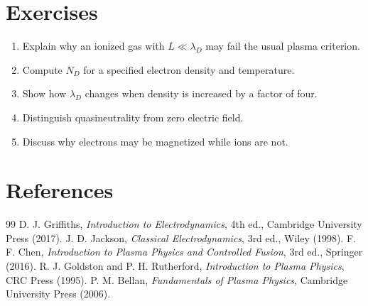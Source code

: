 \documentclass[11pt]{article}
\begin{document}
\section{Exercises}
\begin{enumerate}[leftmargin=1.8em]
\item Explain why an ionized gas with $L\ll\lambda_D$ may fail the usual plasma criterion.
\item Compute $N_D$ for a specified electron density and temperature.
\item Show how $\lambda_D$ changes when density is increased by a factor of four.
\item Distinguish quasineutrality from zero electric field.
\item Discuss why electrons may be magnetized while ions are not.
\end{enumerate}

\section{References}
\begin{thebibliography}{99}
 D. J. Griffiths, \emph{Introduction to Electrodynamics}, 4th ed., Cambridge University Press (2017).
 J. D. Jackson, \emph{Classical Electrodynamics}, 3rd ed., Wiley (1998).
 F. F. Chen, \emph{Introduction to Plasma Physics and Controlled Fusion}, 3rd ed., Springer (2016).
 R. J. Goldston and P. H. Rutherford, \emph{Introduction to Plasma Physics}, CRC Press (1995).
 P. M. Bellan, \emph{Fundamentals of Plasma Physics}, Cambridge University Press (2006).
\end{thebibliography}
\end{document}

